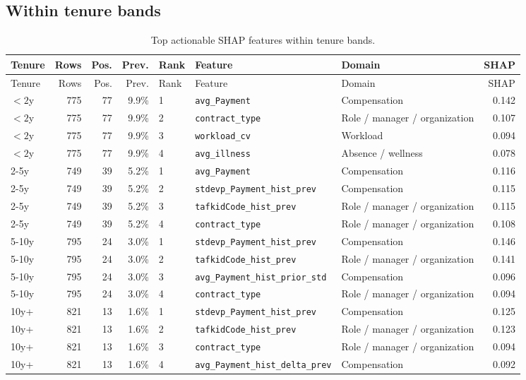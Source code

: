 \documentclass[11pt]{article}
\newcommand{\feature}[1]{\texttt{#1}}
\begin{document}
\subsection{Within tenure bands}

\begin{longtable}{lrrrlp{4cm}p{3cm}r}
\caption{Top actionable SHAP features within tenure bands.}\\
\toprule
Tenure & Rows & Pos. & Prev. & Rank & Feature & Domain & SHAP \\
\midrule
\endfirsthead
\toprule
Tenure & Rows & Pos. & Prev. & Rank & Feature & Domain & SHAP \\
\midrule
\endhead
$<2$y & 775 & 77 & 9.9\% & 1 & \feature{avg\_Payment} & Compensation & 0.142 \\
$<2$y & 775 & 77 & 9.9\% & 2 & \feature{contract\_type} & Role / manager / organization & 0.107 \\
$<2$y & 775 & 77 & 9.9\% & 3 & \feature{workload\_cv} & Workload & 0.094 \\
$<2$y & 775 & 77 & 9.9\% & 4 & \feature{avg\_illness} & Absence / wellness & 0.078 \\
2-5y & 749 & 39 & 5.2\% & 1 & \feature{avg\_Payment} & Compensation & 0.116 \\
2-5y & 749 & 39 & 5.2\% & 2 & \feature{stdevp\_Payment\_hist\_prev} & Compensation & 0.115 \\
2-5y & 749 & 39 & 5.2\% & 3 & \feature{tafkidCode\_hist\_prev} & Role / manager / organization & 0.115 \\
2-5y & 749 & 39 & 5.2\% & 4 & \feature{contract\_type} & Role / manager / organization & 0.108 \\
5-10y & 795 & 24 & 3.0\% & 1 & \feature{stdevp\_Payment\_hist\_prev} & Compensation & 0.146 \\
5-10y & 795 & 24 & 3.0\% & 2 & \feature{tafkidCode\_hist\_prev} & Role / manager / organization & 0.141 \\
5-10y & 795 & 24 & 3.0\% & 3 & \feature{avg\_Payment\_hist\_prior\_std} & Compensation & 0.096 \\
5-10y & 795 & 24 & 3.0\% & 4 & \feature{contract\_type} & Role / manager / organization & 0.094 \\
10y+ & 821 & 13 & 1.6\% & 1 & \feature{stdevp\_Payment\_hist\_prev} & Compensation & 0.125 \\
10y+ & 821 & 13 & 1.6\% & 2 & \feature{tafkidCode\_hist\_prev} & Role / manager / organization & 0.123 \\
10y+ & 821 & 13 & 1.6\% & 3 & \feature{contract\_type} & Role / manager / organization & 0.094 \\
10y+ & 821 & 13 & 1.6\% & 4 & \feature{avg\_Payment\_hist\_delta\_prev} & Compensation & 0.092 \\
\bottomrule
\end{longtable}
\end{document}
